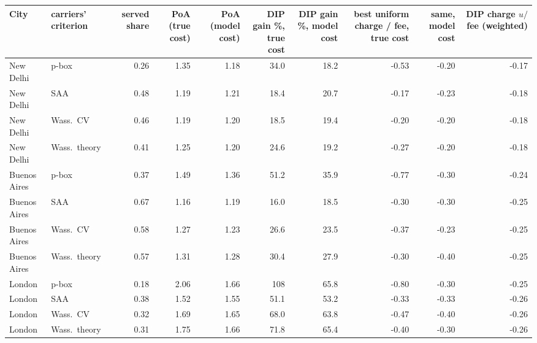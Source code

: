 \begin{tabular}{llrrrrrrrr}
\toprule
City & carriers' criterion & served share & PoA (true cost) & PoA (model cost) & DIP gain \%, true cost & DIP gain \%, model cost & best uniform charge / fee, true cost & same, model cost & DIP charge $u/$fee (weighted) \\
\midrule
New Delhi & p-box & 0.26 & 1.35 & 1.18 & 34.0 & 18.2 & -0.53 & -0.20 & -0.17 \\
New Delhi & SAA & 0.48 & 1.19 & 1.21 & 18.4 & 20.7 & -0.17 & -0.23 & -0.18 \\
New Delhi & Wass.\ CV & 0.46 & 1.19 & 1.20 & 18.5 & 19.4 & -0.20 & -0.20 & -0.18 \\
New Delhi & Wass.\ theory & 0.41 & 1.25 & 1.20 & 24.6 & 19.2 & -0.27 & -0.20 & -0.18 \\
Buenos Aires & p-box & 0.37 & 1.49 & 1.36 & 51.2 & 35.9 & -0.77 & -0.30 & -0.24 \\
Buenos Aires & SAA & 0.67 & 1.16 & 1.19 & 16.0 & 18.5 & -0.30 & -0.30 & -0.25 \\
Buenos Aires & Wass.\ CV & 0.58 & 1.27 & 1.23 & 26.6 & 23.5 & -0.37 & -0.23 & -0.25 \\
Buenos Aires & Wass.\ theory & 0.57 & 1.31 & 1.28 & 30.4 & 27.9 & -0.30 & -0.40 & -0.25 \\
London & p-box & 0.18 & 2.06 & 1.66 & 108 & 65.8 & -0.80 & -0.30 & -0.25 \\
London & SAA & 0.38 & 1.52 & 1.55 & 51.1 & 53.2 & -0.33 & -0.33 & -0.26 \\
London & Wass.\ CV & 0.32 & 1.69 & 1.65 & 68.0 & 63.8 & -0.47 & -0.40 & -0.26 \\
London & Wass.\ theory & 0.31 & 1.75 & 1.66 & 71.8 & 65.4 & -0.40 & -0.30 & -0.26 \\
\bottomrule
\end{tabular}
